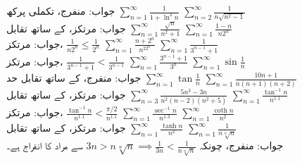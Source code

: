 جواب:\quad
منفرج، تکملی پرکھ
$\sum\limits_{n=1}^{\infty}\frac{1}{1+\ln^2n}$
$\sum\limits_{n=2}^{\infty}\frac{1}{n\sqrt{n^2-1}}$\\
جواب:\quad
مرتکز،  کے ساتھ تقابل
$\sum\limits_{n=1}^{\infty}\frac{\sqrt{n}}{n^2+1}$
$\sum\limits_{n=1}^{\infty}\frac{1-n}{n2^n}$\\
جواب:\quad
مرتکز، 
$\tfrac{1}{n2^n}\le\tfrac{1}{2^n}$
$\sum\limits_{n=1}^{\infty}\frac{n+2^n}{n^22^n}$
$\sum\limits_{n=1}^{\infty}\frac{1}{3^{n-1}+1}$\\
جواب:\quad
مرتکز، 
$\tfrac{1}{3^{n-1}+1}<\tfrac{1}{3^{n-1}}$
$\sum\limits_{n=1}^{\infty}\frac{3^{n-1}+1}{3^n}$
$\sum\limits_{n=1}^{\infty}\sin\frac{1}{n}$\\
جواب:\quad
منفرج،  کے ساتھ تقابل حد
$\sum\limits_{n=1}^{\infty}\tan\frac{1}{n}$
$\sum\limits_{n=1}^{\infty}\frac{10n+1}{n(n+1)(n+2)}$\\
جواب:\quad
مرتکز،  کے ساتھ تقابل
$\sum\limits_{n=3}^{\infty}\frac{5n^3-3n}{n^2(n-2)(n^2+5)}$
$\sum\limits_{n=1}^{\infty}\frac{\tan^{-1}n}{n^{1.1}}$\\
جواب:\quad
مرتکز، 
$\tfrac{\tan^{-1}n}{n^{1.1}}<\tfrac{\pi/2}{n^{1.1}}$
$\sum\limits_{n=1}^{\infty}\frac{\sec^{-1}n}{n^{1.3}}$
$\sum\limits_{n=1}^{\infty}\frac{\coth n}{n^2}$\\
جواب:\quad
مرتکز،  کے ساتھ تقابل
$\sum\limits_{n=1}^{\infty}\frac{\tanh n}{n^2}$
$\sum\limits_{n=1}^{\infty}\frac{1}{n\sqrt[n]{n}}$\\
جواب:\quad
منفرج، چونکہ 
$3n>n\sqrt[n]{n}\implies \tfrac{1}{3n}<\tfrac{1}{n\sqrt[n]{n}}$ 
سے مراد  کا انفراج ہے۔
